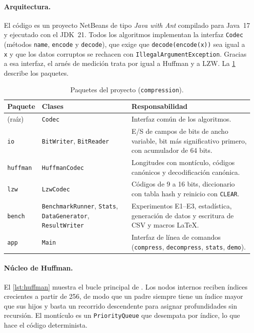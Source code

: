 \paragraph{Arquitectura.} El código es un proyecto NetBeans de tipo \emph{Java with Ant}
compilado para Java~17 y ejecutado con el JDK~21. Todos los algoritmos implementan la interfaz
\texttt{Codec} (métodos \texttt{name}, \texttt{encode} y \texttt{decode}), que exige que
\texttt{decode(encode(x))} sea igual a \texttt{x} y que los datos corruptos se rechacen con
\texttt{IllegalArgumentException}. Gracias a esa interfaz, el arnés de medición trata por igual
a Huffman y a LZW. La \cref{tab:paquetes} describe los paquetes.

\begin{table}[H]
  \centering
  \caption{Paquetes del proyecto (\texttt{compression}).}
  \label{tab:paquetes}
  \small
  \begin{tabularx}{\linewidth}{@{}l >{\raggedright}p{3.9cm} >{\raggedright\arraybackslash}X@{}}
    \toprule
    Paquete & Clases & Responsabilidad \\
    \midrule
    (raíz) & \texttt{Codec} & Interfaz común de los algoritmos. \\
    \texttt{io} & \texttt{BitWriter}, \texttt{BitReader} & E/S de campos de bits de ancho variable, bit más significativo primero, con acumulador de 64 bits. \\
    \texttt{huffman} & \texttt{HuffmanCodec} & Longitudes con montículo, códigos canónicos y decodificación canónica. \\
    \texttt{lzw} & \texttt{LzwCodec} & Códigos de 9 a 16 bits, diccionario con tabla hash y reinicio con \texttt{CLEAR}. \\
    \texttt{bench} & \texttt{BenchmarkRunner}, \texttt{Stats}, \texttt{DataGenerator}, \texttt{ResultWriter} & Experimentos E1--E3, estadística, generación de datos y escritura de CSV y macros \LaTeX. \\
    \texttt{app} & \texttt{Main} & Interfaz de línea de comandos (\texttt{compress}, \texttt{decompress}, \texttt{stats}, \texttt{demo}). \\
    \bottomrule
  \end{tabularx}
\end{table}

\paragraph{Núcleo de Huffman.} El \cref{lst:huffman} muestra el bucle principal de
. Los nodos internos reciben índices crecientes a partir de
256, de modo que un padre siempre tiene un índice mayor que sus hijos y basta un recorrido
descendente para asignar profundidades sin recursión. El montículo es un
\texttt{PriorityQueue} que desempata por índice, lo que hace el código determinista.

